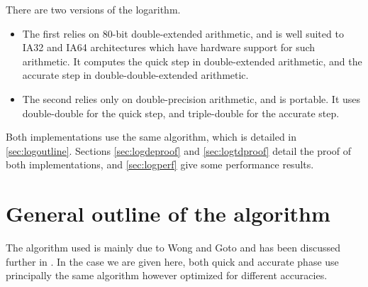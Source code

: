 There are two versions of the logarithm.
\begin{itemize}
\item The first relies on 80-bit double-extended arithmetic, and is
  well suited to IA32 and IA64 architectures which have hardware
  support for such arithmetic. It computes the quick step in
  double-extended arithmetic, and the accurate step in
  double-double-extended arithmetic.
\item The second relies only on double-precision arithmetic, and is
  portable. It uses double-double for the quick step, and
  triple-double for the accurate step.
\end{itemize}

Both implementations use the same algorithm, which is detailed in
\ref{sec:logoutline}. Sections \ref{sec:logdeproof} and
\ref{sec:logtdproof} detail the proof of both implementations, and
\ref{sec:logperf} give some performance results.


\section{General outline of the algorithm\label{sec:logoutline}}
The algorithm used is mainly due to 
Wong and Goto\cite{WG94} and has been discussed further in \cite{Muller97}. In the case we are given here,
both quick and accurate phase use principally the same algorithm however optimized for different accuracies.

